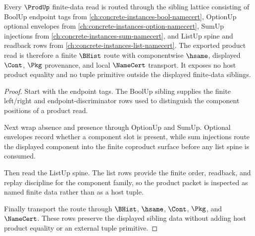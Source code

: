 \begin{theorem}
\label{thm:prod-finite-data-sibling-orphan-route}
Every $\ProdUp$ finite-data read is routed through the sibling lattice consisting of BoolUp endpoint tags from \autoref{ch:concrete-instances-bool-namecert}, OptionUp optional envelopes from \autoref{ch:concrete-instances-option-namecert}, SumUp injections from \autoref{ch:concrete-instances-sum-namecert}, and ListUp spine and readback rows from \autoref{ch:concrete-instances-list-namecert}. The exported product read is therefore a finite $\BHist$ route with componentwise $\hsame$, displayed $\Cont$, $\Pkg$ provenance, and local $\NameCert$ transport. It exposes no host product equality and no tuple primitive outside the displayed finite-data siblings.
\end{theorem}
\begin{proof}
Start with the endpoint tags. The BoolUp sibling supplies the finite left/right and endpoint-discriminator rows used to distinguish the component positions of a product read.

Next wrap absence and presence through OptionUp and SumUp. Optional envelopes record whether a component slot is present, while sum injections route the displayed component into the finite coproduct surface before any list spine is consumed.

Then read the ListUp spine. The list rows provide the finite order, readback, and replay discipline for the component family, so the product packet is inspected as named finite data rather than as a host tuple.

Finally transport the route through $\BHist$, $\hsame$, $\Cont$, $\Pkg$, and $\NameCert$. These rows preserve the displayed sibling data without adding host product equality or an external tuple primitive.
\end{proof}
